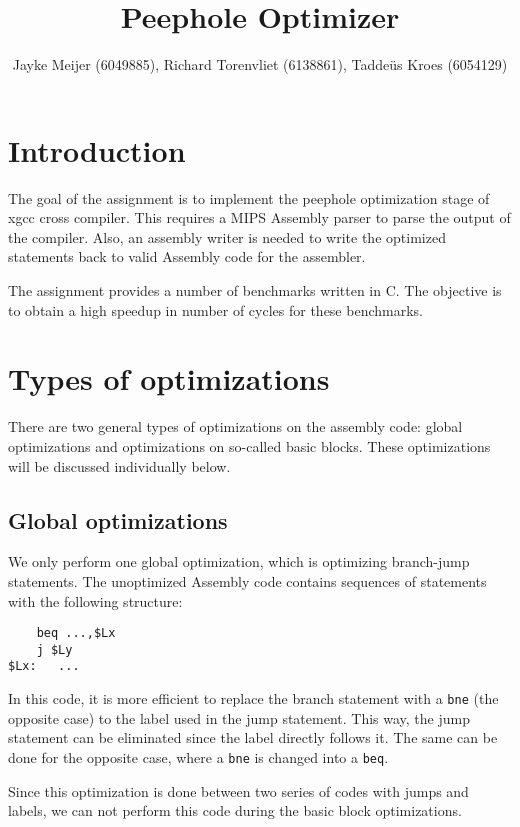 \documentclass[10pt,a4paper]{article}
\title{Peephole Optimizer}
\author{Jayke Meijer (6049885), Richard Torenvliet (6138861), Tadde\"us Kroes
    (6054129)}
\begin{document}
\maketitle
\tableofcontents

\pagebreak

\section{Introduction}

The goal of the assignment is to implement the peephole optimization stage of
xgcc cross compiler. This requires a MIPS Assembly parser to parse the output
of the compiler. Also, an assembly writer is needed to write the optimized
statements back to valid Assembly code for the assembler.

The assignment provides a number of benchmarks written in C. The objective is
to obtain a high speedup in number of cycles for these benchmarks.

\section{Types of optimizations}

There are two general types of optimizations on the assembly code: global
optimizations and optimizations on so-called basic blocks. These optimizations
will be discussed individually below.

\subsection{Global optimizations}

We only perform one global optimization, which is optimizing branch-jump
statements. The unoptimized Assembly code contains sequences of statements with
the following structure:
\begin{verbatim}
    beq ...,$Lx
    j $Ly
$Lx:   ...
\end{verbatim}
In this code, it is more efficient to replace the branch statement with a
\texttt{bne} (the opposite case) to the label used in the jump statement. This
way, the jump statement can be eliminated since the label directly follows it.
The same can be done for the opposite case, where a \texttt{bne} is changed
into a \texttt{beq}.

Since this optimization is done between two series of codes with jumps and
labels, we can not perform this code during the basic block optimizations.
\end{document}
